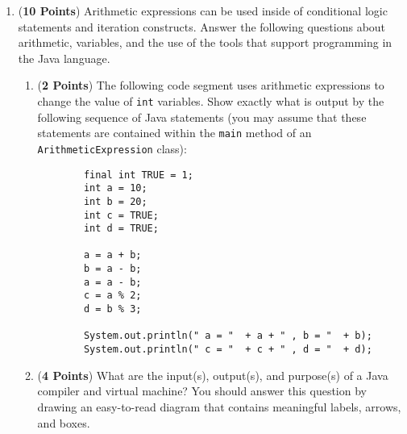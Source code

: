 \documentclass[12pt]{article}
\begin{document}
\begin{enumerate}

\item ({\bf 10 Points}) Arithmetic expressions can be used inside of conditional logic statements and iteration
  constructs.  Answer the following questions about arithmetic, variables, and the use of the tools that support
  programming in the Java language.

\begin{enumerate}

\item ({\bf 2 Points}) The following code segment uses arithmetic expressions to change the value of {\tt int}
  variables.  Show exactly what is output by the following sequence of Java statements (you may assume that these
  statements are contained within the {\tt main} method of an {\tt ArithmeticExpression} class):

  \begin{verbatim}
        final int TRUE = 1;
        int a = 10;
        int b = 20;
        int c = TRUE;
        int d = TRUE;
        
        a = a + b;
        b = a - b;
        a = a - b;
        c = a % 2;
        d = b % 3;
        
        System.out.println(" a = "  + a + " , b = "  + b);
        System.out.println(" c = "  + c + " , d = "  + d);
  \end{verbatim}
  \vspace*{-.2in}

\item ({\bf 4 Points}) What are the input(s), output(s), and purpose(s) of a Java compiler and virtual machine?  You
  should answer this question by drawing an easy-to-read diagram that contains meaningful labels, arrows, and boxes.




\end{enumerate}
\end{enumerate}
\end{document}

